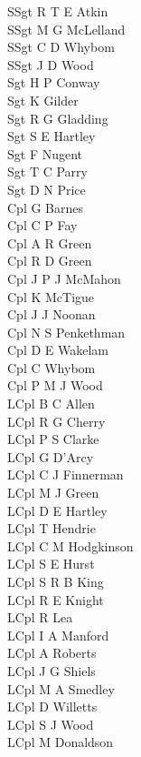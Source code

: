 \begin{multicols}{4}
  \scriptsize
  \noindent
  SSgt R T E Atkin \\
  SSgt M G McLelland \\
  SSgt C D Whybom \\
  SSgt J D Wood \\
  Sgt H P Conway \\
  Sgt K Gilder \\
  Sgt R G Gladding \\
  Sgt S E Hartley \\
  Sgt F Nugent \\
  Sgt T C Parry \\
  Sgt D N Price \\
  Cpl G Barnes \\
  Cpl C P Fay \\
  Cpl A R Green \\
  Cpl R D Green \\
  Cpl J P J McMahon \\
  Cpl K McTigue \\
  Cpl J J Noonan \\
  Cpl N S Penkethman \\
  Cpl D E Wakelam \\
  Cpl C Whybom \\
  Cpl P M J Wood \\
  LCpl B C Allen \\
  LCpl R G Cherry \\
  LCpl P S Clarke \\
  LCpl G D'Arcy \\
  LCpl C J Finnerman \\
  LCpl M J Green \\
  LCpl D E Hartley \\
  LCpl T Hendrie \\
  LCpl C M Hodgkinson \\
  LCpl S E Hurst \\
  LCpl S R B King \\
  LCpl R E Knight \\
  LCpl R Lea \\
  LCpl I A Manford \\
  LCpl A Roberts \\
  LCpl J G Shiels \\
  LCpl M A Smedley \\
  LCpl D Willetts \\
  LCpl S J Wood \\
  LCpl M Donaldson \\

\end{multicols}
